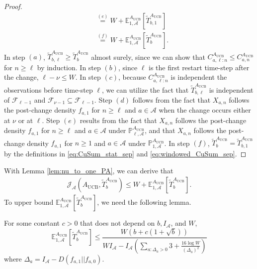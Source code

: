 \documentclass[letterpaper, 10 pt, conference]{ieeeconf}  %
\newcommand{\lp}{\left(}
\newcommand{\rp}{\right)}
\newcommand{\lb}{\left[}
\newcommand{\rb}{\right]}
\newcommand{\mcal}{\mathcal}
\newcommand{\mrm}{\mathrm}
\newcommand{\mbb}{\mathbb}
\newcommand{\E}{\mathbb{E}}
\begin{document}
\begin{proof}
\begin{align}
    &\overset{(e)}{=} W + \E_{1,\mcal{A}}^{A_{\mrm{UCB}}} \lb \tilde{T}_{b, 1}^{A_{\mrm{UCB}}} \rb \nonumber\\
    &\overset{(f)}{=} W + \E_{1,\mcal{A}}^{A_{\mrm{UCB}}} \lb \tilde{T}_{b}^{A_{\mrm{UCB}}} \rb. \label{eq:CuSum_Lem1_laststep_sep}
\end{align}
%
In step $(a)$, $\tilde{T}_{b, \ell}^{A_{\mrm{UCB}}} \geq \tilde{T}_{b}^{A_{\mrm{UCB}}}$ almost surely, since we can show that $C_{a,\ell:n}^{A_{\mrm{UCB}}} \leq C_{a,n}^{A_{\mrm{UCB}}}$ for $n \geq \ell$ by induction. In step $(b)$, since $\ell$ is the first restart time-step after the change, $\ell - \nu \leq W$. In step $(c)$, because $C_{a,\ell:n}^{A_{\mrm{UCB}}}$ is independent the observations before time-step $\ell$, we can utilize the fact that $\tilde{T}_{b, \ell}^{A_{\mrm{UCB}}}$ is independent of $\mcal{F}_{\ell - 1}$ and $\mcal{F}_{\nu - 1} \subseteq \mcal{F}_{\ell - 1}$. Step $(d)$ follows from the fact that $X_{a,n}$ follows the post-change density $f_{a,1}$ for $n \geq \ell$ and $a \in \mcal{A}$ when the change occurs either at $\nu$ or at $\ell$. Step $(e)$ results from the fact that $X_{a,n}$ follows the post-change density $f_{a,1}$ for $n \geq \ell$ and $a \in \mcal{A}$ under $\mbb{P}_{\ell, \mcal{A}}^{A_{\mrm{UCB}}}$, and that $X_{a,n}$ follows the post-change density $f_{a,1}$ for $n \geq 1$ and $a \in \mcal{A}$ under $\mbb{P}_{1, \mcal{A}}^{A_{\mrm{UCB}}}$. In step $(f)$, $\tilde{T}_{b}^{A_{\mrm{UCB}}}=\tilde{T}_{b, 1}^{A_{\mrm{UCB}}}$  by the definitions in \eqref{eq:CuSum_stat_sep} and \eqref{eq:windowed_CuSum_sep}.
\end{proof}

With Lemma \ref{lem:nu_to_one_PA}, we can derive that
%
\begin{align}
    \mcal{J}_{\mcal{A}} \lp A_{\mrm{UCB}}, \tilde{T}_{b}^{A_{\mrm{UCB}}} \rp \leq W + \E_{1,\mcal{A}}^{A_{\mrm{UCB}}} \lb \tilde{T}_{b}^{A_{\mrm{UCB}}} \rb.
\end{align}
%
To upper bound $\E_{1,\mcal{A}}^{A_{\mrm{UCB}}} \lb \tilde{T}_{b}^{A_{\mrm{UCB}}} \rb$, we need the following lemma.

\begin{lemma}\label{lem:E1_upp_PA_UCB_CuSum}
For some constant $c > 0$ that does not depend on $b, I_{\mcal{A}}$, and $W$,
%
\begin{equation}
    \E_{1,\mcal{A}}^{A_{\mrm{UCB}}} \lb \tilde{T}_{b}^{A_{\mrm{UCB}}} \rb \leq \frac{W \lp b + c \lp 1 + \sqrt{b} \rp \rp}{WI_{\mcal{A}} - I_{\mcal{A}}\lp \sum_{a: \Delta_{a} > 0} 3 + \frac{16 \log W}{\lp\Delta_{a}\rp^{2}} \rp}
\end{equation}
%
where $\Delta_{a} = I_{\mcal{A}} - D \lp f_{a,1} || f_{a,0} \rp$.
\end{lemma}
\end{document}
